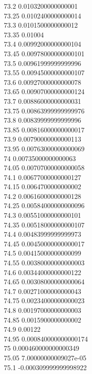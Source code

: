 {73.2	0.0103200000000001\\
73.25	0.0102400000000014\\
73.3	0.0101500000000012\\
73.35	0.01004\\
73.4	0.00992000000000104\\
73.45	0.00978000000000101\\
73.5	0.00961999999999996\\
73.55	0.00945000000000107\\
73.6	0.00927000000000078\\
73.65	0.00907000000000124\\
73.7	0.00886000000000031\\
73.75	0.00863999999999976\\
73.8	0.00839999999999996\\
73.85	0.00816000000000017\\
73.9	0.00790000000000113\\
73.95	0.00763000000000069\\
74	0.00735000000000063\\
74.05	0.00707000000000058\\
74.1	0.00677000000000127\\
74.15	0.0064700000000002\\
74.2	0.00616000000000128\\
74.25	0.00584000000000096\\
74.3	0.00551000000000101\\
74.35	0.00518000000000107\\
74.4	0.00483999999999973\\
74.45	0.00450000000000017\\
74.5	0.00415000000000099\\
74.55	0.00380000000000003\\
74.6	0.00344000000000122\\
74.65	0.00308000000000064\\
74.7	0.00271000000000043\\
74.75	0.00234000000000023\\
74.8	0.00197000000000003\\
74.85	0.0015900000000002\\
74.9	0.00122\\
74.95	0.000840000000000174\\
75	0.000460000000000349\\
75.05	7.00000000009027e-05\\
75.1	-0.000309999999998922\\
}
